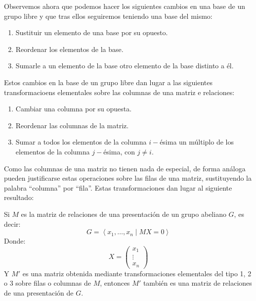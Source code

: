 \noindent
Observemos ahora que podemos hacer los siguientes cambios en una base de un grupo libre y que tras ellos seguiremos teniendo una base del mismo:
\begin{enumerate}
    \item Sustituir un elemento de una base por su opuesto.
    \item Reordenar los elementos de la base.
    \item Sumarle a un elemento de la base otro elemento de la base distinto a él.
\end{enumerate}
Estos cambios en la base de un grupo libre dan lugar a las siguientes transformacioens elementales sobre las columnas de una matriz e relaciones:
\begin{enumerate}
    \item Cambiar una columna por su opuesta.
    \item Reordenar las columnas de la matriz.
    \item Sumar a todos los elementos de la columna $i-$ésima un múltiplo de los elementos de la columna $j-$ésima, con $j\neq i$.
\end{enumerate}
Como las columnas de una matriz no tienen nada de especial, de forma análoga pueden justificarse estas operaciones sobre las filas de una matriz, sustituyendo la palabra ``columna'' por ``fila''. Estas transformaciones dan lugar al siguiente resultado:

\begin{prop}
    Si $M$ es la matriz de relaciones de una presentación de un grupo abeliano $G$, es decir:
    \begin{equation*}
        G = \left\langle x_1,\ldots,x_n \mid MX = 0  \right\rangle 
    \end{equation*}
    Donde:
    \begin{equation*}
        X = \left(\begin{array}{c}
            x_1 \\
            \vdots \\
            x_n
        \end{array}\right)
    \end{equation*}
    Y $M'$ es una matriz obtenida mediante transformaciones elementales del tipo 1, 2 o 3 sobre filas o columnas de $M$, entonces $M'$ también es una matriz de relaciones de una presentación de $G$.
\end{prop}


